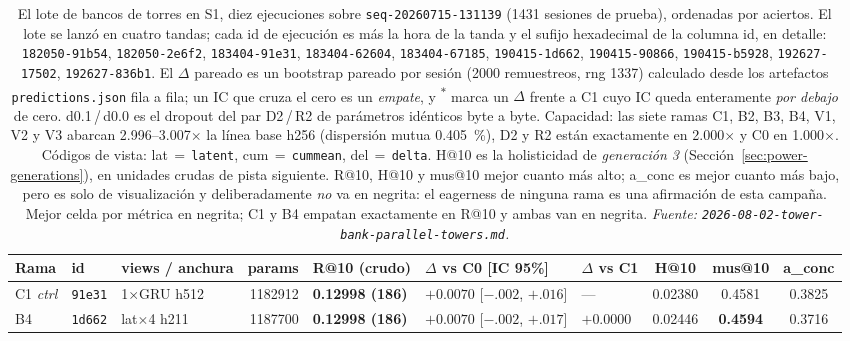 \documentclass[11pt]{article}
\newcommand{\runid}[1]{\texttt{\small\seqsplit{#1}}}
\newcommand{\dsid}[1]{\texttt{\small #1}}
\newcommand{\best}[1]{\textbf{#1}}
\begin{document}
\begin{table}[ht]
  \centering
  \caption{El lote de bancos de torres en S1, diez ejecuciones sobre
  \dsid{seq-20260715-131139} (\num{1431} sesiones de prueba), ordenadas por
  aciertos. El lote se lanzó en cuatro tandas; cada id de ejecución es
  \protect\runid{run-20260802-} más la hora de la tanda y el sufijo hexadecimal de
  la columna id, en detalle: \texttt{182050-91b54}, \texttt{182050-2e6f2},
  \texttt{183404-91e31}, \texttt{183404-62604}, \texttt{183404-67185},
  \texttt{190415-1d662}, \texttt{190415-90866}, \texttt{190415-b5928},
  \texttt{192627-17502}, \texttt{192627-836b1}. El $\Delta$ pareado es un bootstrap
  pareado por sesión (\num{2000} remuestreos, rng \num{1337}) calculado desde los
  artefactos \texttt{predictions.json} fila a fila; un IC que cruza el cero es un
  \emph{empate}, y \textsuperscript{$\ast$} marca un $\Delta$ frente a C1 cuyo IC
  queda enteramente \emph{por debajo} de cero. d\num{0.1}\,/\,d\num{0.0} es el
  dropout del par D2\,/\,R2 de parámetros idénticos byte a byte. Capacidad: las
  siete ramas C1, B2, B3, B4, V1, V2 y V3 abarcan
  \numrange{2.996}{3.007}$\times$ la línea base h256 (dispersión mutua
  \SI{0.405}{\percent}), D2 y R2 están exactamente en \num{2.000}$\times$ y C0 en
  \num{1.000}$\times$. Códigos de vista: lat\,$=$\,\texttt{latent},
  cum\,$=$\,\texttt{cummean}, del\,$=$\,\texttt{delta}. H@10 es la holisticidad de
  \emph{generación 3} (Sección~\ref{sec:power-generations}), en unidades crudas de
  pista siguiente. R@10, H@10 y mus@10 mejor cuanto más alto; a\_conc es mejor
  cuanto más bajo, pero es solo de visualización y deliberadamente \emph{no} va en
  negrita: el eagerness de ninguna rama es una afirmación de esta campaña. Mejor
  celda por métrica en negrita; C1 y B4 empatan exactamente en R@10 y ambas van en
  negrita.
  \emph{Fuente: \texttt{2026-08-02-tower-bank-parallel-towers.md}.}}
  \label{tab:towerbank-s1}
  {\scriptsize\setlength{\tabcolsep}{1.9pt}\begin{tabular}{lllrlllccc}
    \toprule
    Rama & id & views / anchura & params & R@10 (crudo) & $\Delta$ vs C0 [IC 95\%] & $\Delta$ vs C1 & H@10 & mus@10 & a\_conc \\
    \midrule
    C1 \emph{ctrl} & \texttt{91e31} & 1$\times$GRU h512 & \num{1182912} & \best{0.12998 (186)} & $+0.0070$ [$-.002$, $+.016$] & --- & 0.02380 & 0.4581 & 0.3825 \\
    B4 & \texttt{1d662} & lat$\times$4 h211 & \num{1187700} & \best{0.12998 (186)} & $+0.0070$ [$-.002$, $+.017$] & $+0.0000$ & 0.02446 & \best{0.4594} & 0.3716 \\

\end{tabular}}
\end{table}
\end{document}
